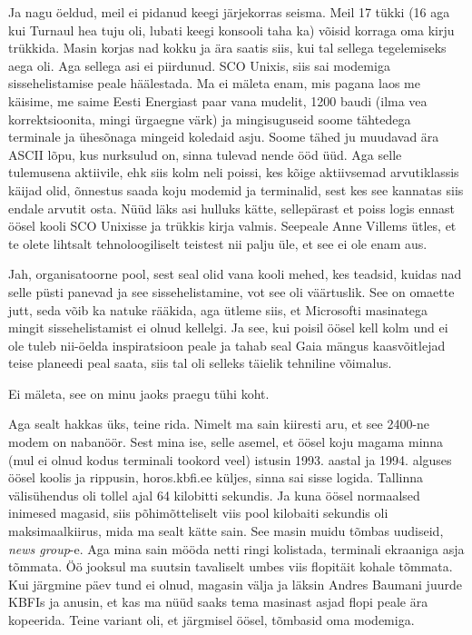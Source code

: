 Ja nagu öeldud, meil ei pidanud keegi järjekorras seisma. Meil 17 tükki (16 aga kui Turnaul hea tuju oli, lubati keegi konsooli taha ka) võisid korraga oma kirju trükkida. Masin korjas nad kokku ja ära saatis siis, kui tal sellega tegelemiseks aega oli. Aga sellega asi ei piirdunud. SCO Unixis, siis sai modemiga sissehelistamise peale häälestada. Ma ei mäleta enam, mis pagana laos me käisime, me saime Eesti Energiast paar vana mudelit, 1200 baudi (ilma vea korrektsioonita, mingi ürgaegne värk) ja mingisuguseid soome tähtedega terminale ja ühesõnaga mingeid koledaid asju. Soome tähed ju muudavad ära ASCII lõpu, kus nurksulud on, sinna tulevad nende ööd üüd. Aga selle tulemusena aktiivile, ehk siis kolm neli poissi, kes kõige aktiivsemad arvutiklassis käijad olid, õnnestus saada koju modemid ja terminalid, sest kes see kannatas siis endale arvutit osta. Nüüd läks asi hulluks kätte, sellepärast et poiss logis ennast öösel kooli SCO Unixisse ja trükkis kirja valmis.  Seepeale Anne Villems ütles, et te olete lihtsalt tehnoloogiliselt teistest nii palju üle, et see ei ole enam aus. 


Jah, organisatoorne pool, sest seal olid vana kooli mehed, kes teadsid, kuidas nad selle püsti panevad ja see sissehelistamine, vot see oli väärtuslik. See on omaette jutt, seda võib ka natuke rääkida, aga ütleme siis, et  Microsofti masinatega mingit sissehelistamist ei olnud kellelgi. Ja see, kui poisil öösel kell kolm und ei ole tuleb nii-öelda  inspiratsioon peale ja tahab seal Gaia mängus kaasvõitlejad teise planeedi peal saata, siis tal oli selleks täielik tehniline võimalus. 


Ei mäleta, see on minu jaoks praegu tühi koht. 

Aga sealt hakkas üks, teine rida. Nimelt ma sain kiiresti aru, et see 2400-ne  modem on nabanöör. Sest mina ise, selle asemel, et öösel koju magama minna (mul ei olnud kodus terminali tookord veel)  istusin 1993. aastal ja  1994. alguses öösel koolis ja rippusin, horos.kbfi.ee küljes, sinna sai sisse logida. Tallinna välisühendus oli tollel ajal 64 kilobitti sekundis. Ja kuna öösel normaalsed inimesed magasid, siis põhimõtteliselt viis pool kilobaiti sekundis oli maksimaalkiirus, mida ma sealt kätte sain. See masin muidu tõmbas uudiseid, \emph{news group}-e. Aga mina sain mööda netti ringi kolistada,  terminali ekraaniga asja tõmmata. Öö jooksul ma suutsin tavaliselt umbes viis flopitäit kohale tõmmata. Kui  järgmine päev tund ei olnud, magasin välja ja läksin Andres Baumani juurde KBFIs ja anusin, et kas ma nüüd saaks tema masinast asjad flopi peale ära kopeerida. Teine variant oli, et järgmisel öösel, tõmbasid oma modemiga. 

